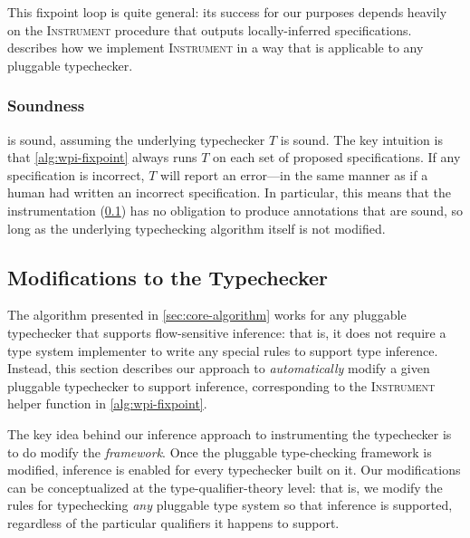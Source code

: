 This fixpoint loop is quite general: its success for our
purposes depends heavily on the \textsc{Instrument} procedure
that outputs locally-inferred specifications. 
describes how we implement \textsc{Instrument} in a way that is
applicable to any pluggable typechecker.

\subsubsection{Soundness}
\label{sec:soundness}

 is sound, assuming the underlying typechecker $T$
is sound. The key intuition is that \cref{alg:wpi-fixpoint} always runs $T$
on each set of proposed specifications. If any specification is incorrect,
$T$ will report an error---in the same manner as if a human had written an
incorrect specification. In particular, this means that the instrumentation
(\cref{sec:instrument}) has no obligation to produce annotations that are sound,
so long as the underlying typechecking algorithm itself is not modified.

\subsection{Modifications to the Typechecker}
\label{sec:instrument}

The algorithm presented in \cref{sec:core-algorithm} works for
any pluggable typechecker that supports flow-sensitive inference:
that is, it does not require a type system implementer to write
any special rules to support type inference. Instead, this section
describes our approach to \emph{automatically} modify a given
pluggable typechecker to support inference, corresponding to the
\textsc{Instrument} helper function in \cref{alg:wpi-fixpoint}.

The key idea behind our inference approach to instrumenting the typechecker
is to do modify the \emph{framework}.  Once the pluggable type-checking
framework is modified, inference is enabled for every typechecker built on it.
Our modifications
can be conceptualized at the type-qualifier-theory level: that is,
we modify the rules for typechecking \emph{any} pluggable type system
so that inference is supported,
regardless of the particular qualifiers it happens to support.

